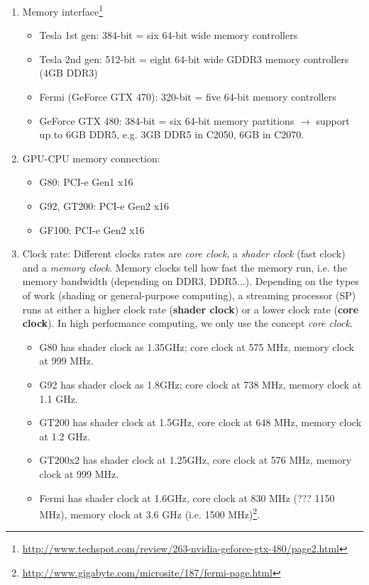\begin{enumerate}
\item Memory interface\footnote{\url{http://www.techspot.com/review/263-nvidia-geforce-gtx-480/page2.html}}
  \begin{itemize}
  \item Tesla 1st gen: 384-bit = six 64-bit wide memory controllers
  \item Tesla 2nd gen: 512-bit = eight 64-bit wide GDDR3 memory controllers (4GB
  DDR3)
  \item Fermi (GeForce GTX 470): 320-bit = five 64-bit memory
  controllers
  \item GeForce GTX 480: 384-bit = six 64-bit memory partitions $\rightarrow$
    support up to 6GB DDR5, e.g. 3GB DDR5 in C2050, 6GB in C2070. 
  \end{itemize}

\item GPU-CPU memory connection:
  \begin{itemize}
  \item G80: PCI-e Gen1 x16 
  \item G92, GT200: PCI-e Gen2 x16 
  \item GF100: PCI-e Gen2 x16 
  \end{itemize}

\item Clock rate: Different clocks rates are {\it core clock}, a {\it shader
clock} (fast clock)  and a {\it memory clock}. Memory clocks tell how fast the
memory run, i.e. the  memory bandwidth (depending on DDR3, DDR5...).  Depending
on the types of work (shading or general-purpose computing), a streaming
processor (SP) runs at either a higher clock rate ({\bf shader clock}) or a
lower clock rate ({\bf core clock}). In high performance computing, we only use
the concept {\it core clock}.
  \begin{itemize}
  \item G80 has shader clock as 1.35GHz; core clock at 575 MHz,
    memory clock at 999 MHz.
  \item G92 has shader clock as 1.8GHz; core clock at 738 MHz,
    memory clock at 1.1 GHz.
  \item GT200 has shader clock at 1.5GHz, core clock at 648 MHz,
    memory clock at 1.2 GHz.
  \item GT200x2 has shader clock at 1.25GHz, core clock at 576 MHz,
    memory clock at 999 MHz.
  \item Fermi has shader clock at 1.6GHz, core clock
    at 830 MHz (??? 1150 MHz), 
    memory clock at 3.6
    GHz (i.e. 1500 MHz)\footnote{\url{http://www.gigabyte.com/microsite/187/fermi-page.html}}. 
  \end{itemize}


\end{enumerate}
